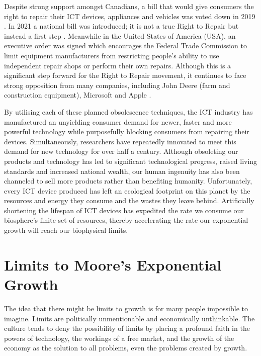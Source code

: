\documentclass{article}
\begin{document}
Despite strong support amongst Canadians, a bill that would give consumers the right to repair their ICT devices, appliances and vehicles was voted down in 2019 \cite{CArighttorepair2020fail}. In 2021 a national bill was introduced; it is not a true Right to Repair but instead a first step \cite{CArighttorepair2021national}. Meanwhile in the United States of America (USA), an executive order was signed which encourages the Federal Trade Commission to limit equipment manufacturers from restricting people's ability to use independent repair shops or perform their own repairs. Although this is a significant step forward for the Right to Repair movement, it continues to face strong opposition from many companies, including John Deere (farm and construction equipment), Microsoft and Apple \cite{cbc2021farmersrighttorepair}.

By utilising each of these planned obsolescence techniques, the ICT industry has manufactured an unyielding consumer demand for newer, faster and more powerful technology while purposefully blocking consumers from repairing their devices. Simultaneously, researchers have repeatedly innovated to meet this demand for new technology for over half a century. Although obsoleting our products and technology has led to significant technological progress, raised living standards and increased national wealth, our human ingenuity has also been channeled to sell more products rather than benefiting humanity. Unfortunately, every ICT device produced has left an ecological footprint on this planet by the resources and energy they consume and the wastes they leave behind. Artificially shortening the lifespan of ICT devices has expedited the rate we consume our biosphere's finite set of resources, thereby accelerating the rate our exponential growth will reach our biophysical limits.

\cleardoublepage
\section{Limits to Moore's Exponential Growth} 
 \begin{fquote} 
 The idea that there might be limits to growth is for many people impossible to imagine. Limits are politically unmentionable and economically unthinkable. The culture tends to deny the possibility of limits by placing a profound faith in the powers of technology, the workings of a free market, and the growth of the economy as the solution to all problems, even the problems created by growth.
 \end{fquote}
 
\end{document}
